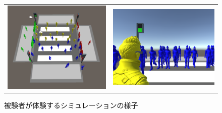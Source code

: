 \documentclass[twocolumn]{jarticle}%
\begin{document}
\begin{figure}[H]
    \begin{tabular}{cc}
      \begin{minipage}[t]{0.45\hsize}
        \centering
        \includegraphics[keepaspectratio, scale=0.11]{images/environment.JPG}
        \caption{シミュレーション環境}
        \label{fig:environment}
      \end{minipage} &
      \begin{minipage}[t]{0.45\hsize}
        \centering
        \includegraphics[keepaspectratio, scale=0.1]{images/user_view_mini.JPG}
        \caption{被験者が体験するシミュレーションの様子}
        \label{fig:user_view}
      \end{minipage}
    \end{tabular}
  \end{figure}
\end{document}

